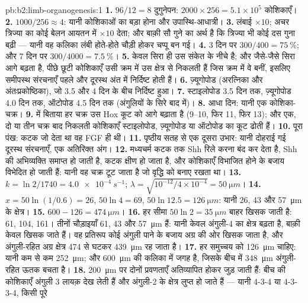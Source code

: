 \begin{solution}{pb:b2:limb-organogenesis:1}
\textbf{1.} $96/12 = 8$ दुगुनेपन: $2000\times 256 = 5.1\times 10^{5}$
कोशिकाएँ।
\textbf{2.} $1000/256 \approx 4$: यानी कोशिकाओं का बड़ा होना और
उपास्थि-आधात्री।
\textbf{3.} लंबाई $\times 10$; अचर त्रिज्या का कोई बेलन आयतन में
$\times 10$ देता; और बाक़ी सौ गुने का अर्थ है कि त्रिज्या भी
कोई दस गुना बढ़ी --- यानी वह कलिका लंबी होते-होते चौड़ी होकर चप्पू बन गई।
\textbf{4.} 3 दिन पर $300/400 = \qty{75}{\%}$; और 7 दिन पर $300/4000 =
\qty{7.5}{\%}$।
\textbf{5.} केवल सिरा ही उस संकेत के नीचे है; और जैसे-जैसे सिरा आगे
बढ़ता है, पीछे छूटी कोशिकाएँ उसी क्रम में उस क्षेत्र से निकलती हैं जिस
क्रम में वे बनीं, इसलिए समीपस्थ संरचनाएँ पहले और दूरस्थ अंत में
निर्दिष्ट होती हैं।
\textbf{6.} ज़्यूगोपोड (अरत्निका और अंतःप्रकोष्ठिका), जो 3.5 और
4 दिन के बीच निर्दिष्ट हुआ।
\textbf{7.} स्टाइलोपोड 3.5 दिन तक, ज़्यूगोपोड 4.0 दिन तक, ऑटोपोड 4.5
दिन तक (अंगुलियों के सिरे बाद में)।
\textbf{8.} आधा दिन: यानी एक कोशिका-चक्र।
\textbf{9.}  में बिताया हर चक्र उस Hox
कूट को आगे बढ़ाता है (9--10, फिर 11, फिर 13); और एक, दो या
तीन चक्र बाद निकलती कोशिकाएँ स्टाइलोपोड, ज़्यूगोपोड या ऑटोपोड का कूट ढोती हैं।
\textbf{10.} पूरा पंख: कटक जो देता था वह FGF ही थी।
\textbf{11.} पृष्ठीय सतह से एक दूसरा उभार: यानी दोहराई गई
दूरस्थ संरचनाएँ, एक अतिरिक्त अंग।
\textbf{12.} मध्यचर्म कटक तक Shh रिले करना बंद कर देता है, Shh की
अभिव्यक्ति समाप्त हो जाती है, कटक क्षीण हो जाता है, और कोशिकाएँ विभाजित
होने के बजाय विभेदित हो जाती हैं: यानी वह चक्र टूट जाता है जो वृद्धि को बनाए रखता था।
\textbf{13.} $k = \ln 2/1740 = \qty{4.0e-4}{s^{-1}}$; $\lambda =
\sqrt{10^{-12}/4\times 10^{-4}} = \qty{50}{\micro m}$।
\textbf{14.} $x = 50\ln(1/0.6) = 26$, $50\ln 4 = 69$, $50\ln 12.5 =
\qty{126}{\micro m}$: यानी 26, 43 और \qty{57}{\micro m} के क्षेत्र।
\textbf{15.} $600 - 126 = \qty{474}{\micro m}$।
\textbf{16.} हर सीमा $50\ln 2 = \qty{35}{\micro
m}$ बाहर खिसक जाती है: 61, 104, 161। तीनों चौड़ाइयाँ 61, 43 और \qty{57}{\micro m} हैं:
यानी केवल अंगुली-4 का क्षेत्र बढ़ता है, बाक़ी केवल खिसक जाते हैं।
वह प्रतिरूप कोई अंगुली पाने के बजाय अग्र की ओर खिसक जाता है, और
अंगुली-रहित अग्र क्षेत्र 474 से घटकर \qty{439}{\micro m} रह जाता है।
\textbf{17.} हर समुच्चय को \qty{126}{\micro m} चाहिए: यानी कम से कम
\qty{252}{\micro m}; और \qty{600}{\micro m} की कलिका में जगह है, जिसके
बीच में \qty{348}{\micro m} अंगुली-रहित ऊतक बचता है।
\textbf{18.} \qty{200}{\micro m} पर दोनों प्रवणताएँ अतिव्यापित होकर
जुड़ जाती हैं: बीच की कोशिकाएँ अंगुली 3 लायक़ देख लेती हैं और अंगुली-2 के
क्षेत्र लुप्त हो जाते हैं --- यानी 4-3-4 या 4-3-3-4, किसी पूरे

\end{solution}
